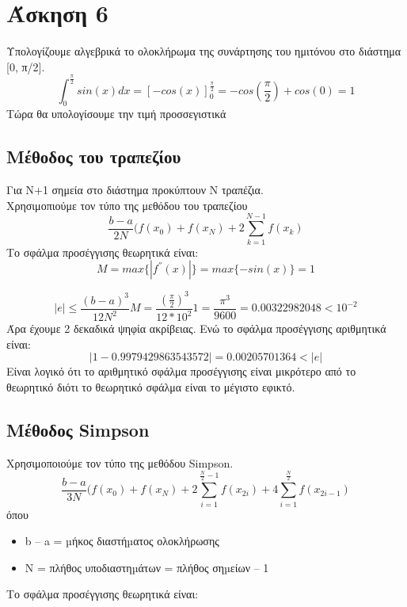 \documentclass[a4paper,11pt]{article}
\newcommand{\gt}{\greektext}
\newcommand{\lt}{\latintext}
\begin{document}
\newpage
\section{Άσκηση 6}
Υπολογίζουμε αλγεβρικά το ολοκλήρωμα της συνάρτησης του ημιτόνου στο διάστημα [0, π/2].
\begin{equation*}
\int^{\frac{\pi}{2}}_{0}sin(x)dx 
= [-cos(x)]^{\frac{\pi}{2}}_0
= -cos(\frac{\pi}{2}) + cos(0) = 1
\end{equation*}
Τώρα θα υπολογίσουμε την τιμή προσσεγιστικά
\subsection{Μέθοδος του τραπεζίου}
Για Ν+1 σημεία στο διάστημα \lt [a,b] \gt προκύπτουν Ν τραπέζια. \\
Χρησιμοπιούμε τον τύπο της μεθόδου του τραπεζίου
\begin{equation*}
\frac{b-a}{2N}(f(x_0)+f(x_N)+2\sum^{N-1}_{k=1}f(x_k)
\end{equation*}
Το σφάλμα προσέγγισης θεωρητικά είναι:
\begin{equation*}
M = max\{|f^{''}(x)|\} = max\{-sin(x)\} = 1
\end{equation*}

\begin{equation*}
|e| \leq \frac{(b-a)^3}{12N^2}M 
= \frac{(\frac{\pi}{2})^3}{12*10^2}1 
= \frac{\pi^3}{9600} = 0.00322982048 < 10^{-2}
\end{equation*}
Άρα έχουμε 2 δεκαδικά ψηφία ακρίβειας.
Ενώ το σφάλμα προσέγγισης αριθμητικά είναι: 
\begin{equation*}
|1 - 0.9979429863543572| = 0.00205701364 < |e|
\end{equation*}
Είναι λογικό ότι το αριθμητικό σφάλμα προσέγγισης είναι μικρότερο από το θεωρητικό διότι το θεωρητικό σφάλμα είναι το μέγιστο εφικτό.

\newpage
\subsection{Μέθοδος \lt Simpson}
Χρησιμοποιούμε τον τύπο της μεθόδου \lt Simpson. \gt
\begin{equation*}
\frac{b-a}{3N}(f(x_0)+f(x_N)+2\sum^{\frac{N}{2}-1}_{i=1}f(x_{2i}) + 4\sum^{\frac{N}{2}}_{i=1}f(x_{2i-1})
\end{equation*}
όπου
\begin{itemize}
\item \lt b – a \gt = µήκος διαστήµατος ολοκλήρωσης 
\item Ν = πλήθος υποδιαστηµάτων = πλήθος σηµείων – 1
\end{itemize}
Το σφάλμα προσέγγισης θεωρητικά είναι:
\end{document}
